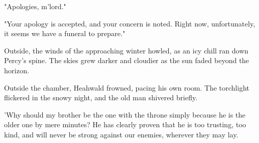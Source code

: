 \documentclass{book}
\begin{document}
"Apologies, m'lord."

"Your apology is accepted, and your concern is noted. Right now, unfortunately, it seems we have a funeral to prepare."

Outside, the winds of the approaching winter howled, as an icy chill ran down Percy's spine. The skies grew darker and cloudier as the sun faded beyond the horizon.

Outside the chamber, Heahwald frowned, pacing his own room. The torchlight flickered in the snowy night, and the old man shivered briefly.

'Why should my brother be the one with the throne simply because he is the older one by mere minutes? He has clearly proven that he is too trusting, too kind, and will never be strong against our enemies, wherever they may lay.
\end{document}
